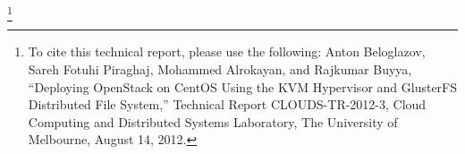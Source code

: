 \thanks{To cite this technical report, please use the following: Anton Beloglazov, Sareh Fotuhi Piraghaj, Mohammed Alrokayan, and Rajkumar Buyya, ``Deploying OpenStack on CentOS Using the KVM Hypervisor and GlusterFS Distributed File System,'' Technical Report CLOUDS-TR-2012-3, Cloud Computing and Distributed Systems Laboratory, The University of Melbourne, August 14, 2012.}
